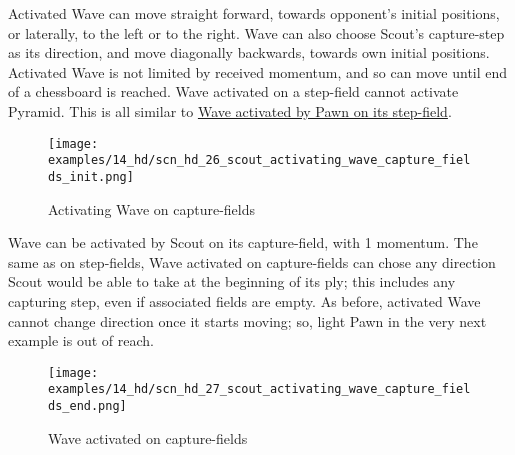 \vspace*{-0.5\baselineskip}
Activated Wave can move straight forward, towards opponent's initial positions, or
laterally, to the left or to the right. Wave can also choose Scout's capture-step
as its direction, and move diagonally backwards, towards own initial positions.\newline
\indent
Activated Wave is not limited by received momentum, and so can move until end of a
chessboard is reached. Wave activated on a step-field cannot activate Pyramid.\newline
\indent
This is all similar to
\hyperref[fig:scn_n_17_sideways_pawn_activated_wave]{Wave activated by Pawn on its step-field}.

\clearpage %

\vspace*{-2.3\baselineskip}
\noindent
\begin{figure}[!h]
\texttt{[image: examples/14\_hd/scn\_hd\_26\_scout\_activating\_wave\_capture\_fields\_init.png]}
\vspace*{-1.4\baselineskip}
\caption{Activating Wave on capture-fields}
\label{fig:scn_hd_26_scout_activating_wave_capture_fields_init}
\end{figure}

\vspace*{-0.5\baselineskip}
Wave can be activated by Scout on its capture-field, with 1 momentum. The same as
on step-fields, Wave activated on capture-fields can chose any direction Scout would
be able to take at the beginning of its ply; this includes any capturing step, even
if associated fields are empty.\newline
\indent
As before, activated Wave cannot change direction once it starts moving; so, light
Pawn in the very next example is out of reach.

\clearpage %

\vspace*{-2.3\baselineskip}
\noindent
\begin{figure}[!h]
\texttt{[image: examples/14\_hd/scn\_hd\_27\_scout\_activating\_wave\_capture\_fields\_end.png]}
\vspace*{-1.4\baselineskip}
\caption{Wave activated on capture-fields}
\label{fig:scn_hd_27_scout_activating_wave_capture_fields_end}
\end{figure}

